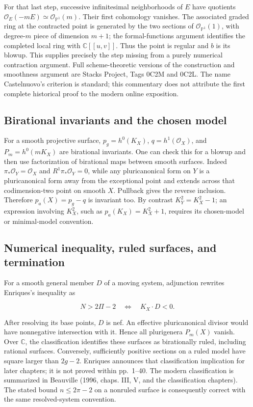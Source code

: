For that last step, successive infinitesimal neighborhoods of \(E\) have quotients \(\mathcal O_E(-mE)\simeq\mathcal O_{\mathbb P^1}(m)\). Their first cohomology vanishes. The associated graded ring at the contracted point is generated by the two sections of \(\mathcal O_{\mathbb P^1}(1)\), with degree-\(m\) piece of dimension \(m+1\); the formal-functions argument identifies the completed local ring with \(\mathbb C[[u,v]]\). Thus the point is regular and \(b\) is its blowup. This supplies precisely the step missing from a purely numerical contraction argument. Full scheme-theoretic versions of the construction and smoothness argument are Stacks Project, Tags 0C2M and 0C2L. The name Castelnuovo's criterion is standard; this commentary does not attribute the first complete historical proof to the modern online exposition.

\subsection{Birational invariants and the chosen model}

For a smooth projective surface, \(p_g=h^0(K_X)\), \(q=h^1(\mathcal O_X)\), and \(P_m=h^0(mK_X)\) are birational invariants. One can check this for a blowup and then use factorization of birational maps between smooth surfaces. Indeed \(\pi_*\mathcal O_Y=\mathcal O_X\) and \(R^1\pi_*\mathcal O_Y=0\), while any pluricanonical form on \(Y\) is a pluricanonical form away from the exceptional point and extends across that codimension-two point on smooth \(X\). Pullback gives the reverse inclusion. Therefore \(p_a(X)=p_g-q\) is invariant too. By contrast \(K_Y^2=K_X^2-1\); an expression involving \(K_X^2\), such as \(p_a(K_X)=K_X^2+1\), requires its chosen-model or minimal-model convention.

\subsection{Numerical inequality, ruled surfaces, and termination}

For a smooth general member \(D\) of a moving system, adjunction rewrites Enriques's inequality as

\[
N>2\Pi-2\quad\Longleftrightarrow\quad K_X\cdot D<0.
\]

After resolving its base points, \(D\) is nef. An effective pluricanonical divisor would have nonnegative intersection with it. Hence all plurigenera \(P_m(X)\) vanish. Over \(\mathbb C\), the classification identifies these surfaces as birationally ruled, including rational surfaces. Conversely, sufficiently positive sections on a ruled model have square larger than \(2g-2\). Enriques announces that classification implication for later chapters; it is not proved within pp.~1--40. The modern classification is summarized in Beauville (1996, chaps. III, V, and the classification chapters). The stated bound \(n\le2\pi-2\) on a nonruled surface is consequently correct with the same resolved-system convention.

